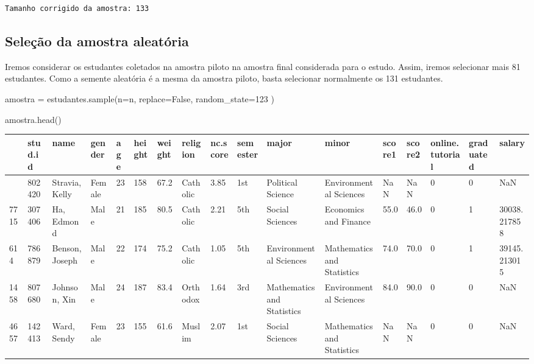 \documentclass[
  letterpaper,
  DIV=11,
  numbers=noendperiod]{scrreprt}
\newenvironment{Shaded}{\begin{snugshade}}{\end{snugshade}}
\newcommand{\DecValTok}[1]{\textcolor[rgb]{0.68,0.00,0.00}{#1}}
\newcommand{\NormalTok}[1]{\textcolor[rgb]{0.00,0.23,0.31}{#1}}
\newcommand{\OperatorTok}[1]{\textcolor[rgb]{0.37,0.37,0.37}{#1}}
\newcommand{\VariableTok}[1]{\textcolor[rgb]{0.07,0.07,0.07}{#1}}
\begin{document}
\begin{verbatim}
Tamanho corrigido da amostra: 133
\end{verbatim}

\subsection{Seleção da amostra
aleatória}\label{seleuxe7uxe3o-da-amostra-aleatuxf3ria-1}

Iremos considerar os estudantes coletados na amostra piloto na amostra
final considerada para o estudo. Assim, iremos selecionar mais 81
estudantes. Como a semente aleatória é a mesma da amostra piloto, basta
selecionar normalmente os 131 estudantes.

\begin{Shaded}
\begin{Highlighting}[]
\NormalTok{amostra }\OperatorTok{=}\NormalTok{ estudantes.sample(n}\OperatorTok{=}\NormalTok{n, replace}\OperatorTok{=}\VariableTok{False}\NormalTok{, random\_state}\OperatorTok{=}\DecValTok{123}\NormalTok{ ) }

\NormalTok{amostra.head()}
\end{Highlighting}
\end{Shaded}

\begin{longtable}[]{@{}lllllllllllllllll@{}}
\toprule\noalign{}
& stud.id & name & gender & age & height & weight & religion & nc.score
& semester & major & minor & score1 & score2 & online.tutorial &
graduated & salary \\
\midrule\noalign{}
\endhead
\bottomrule\noalign{}
\endlastfoot
3165 & 802420 & Stravia, Kelly & Female & 23 & 158 & 67.2 & Catholic &
3.85 & 1st & Political Science & Environmental Sciences & NaN & NaN & 0
& 0 & NaN \\
7715 & 307406 & Ha, Edmond & Male & 21 & 185 & 80.5 & Catholic & 2.21 &
5th & Social Sciences & Economics and Finance & 55.0 & 46.0 & 0 & 1 &
30038.217858 \\
614 & 786879 & Benson, Joseph & Male & 22 & 174 & 75.2 & Catholic & 1.05
& 5th & Environmental Sciences & Mathematics and Statistics & 74.0 &
70.0 & 0 & 1 & 39145.213015 \\
1458 & 807680 & Johnson, Xin & Male & 24 & 187 & 83.4 & Orthodox & 1.64
& 3rd & Mathematics and Statistics & Environmental Sciences & 84.0 &
90.0 & 0 & 0 & NaN \\
4657 & 142413 & Ward, Sendy & Female & 23 & 155 & 61.6 & Muslim & 2.07 &
1st & Social Sciences & Mathematics and Statistics & NaN & NaN & 0 & 0 &
NaN \\
\end{longtable}
\end{document}
